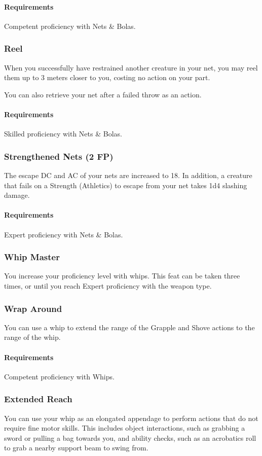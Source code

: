    \paragraph{Requirements} Competent proficiency with Nets \& Bolas.
\subsubsection{Reel} \label{feat::reel}
    When you successfully have restrained another creature in your net, you may reel them up to 3 meters closer to you, costing no action on your part.

    You can also retrieve your net after a failed throw as an action.
    \paragraph{Requirements} Skilled proficiency with Nets \& Bolas.
\subsubsection{Strengthened Nets (2 FP)} \label{feat::strengthenednets}
    The escape DC and AC of your nets are increased to 18.
    In addition, a creature that fails on a Strength (Athletics) to escape from your net takes 1d4 slashing damage.
    \paragraph{Requirements} Expert proficiency with Nets \& Bolas.
\subsubsection{Whip Master} \label{feat::whipmaster}
    You increase your proficiency level with whips.
    This feat can be taken three times, or until you reach Expert proficiency with the weapon type.
\subsubsection{Wrap Around} \label{feat::wraparound}
    You can use a whip to extend the range of the Grapple and Shove actions to the range of the whip.
    \paragraph{Requirements} Competent proficiency with Whips.
\subsubsection{Extended Reach} \label{feat::extendedreach}
    You can use your whip as an elongated appendage to perform actions that do not require fine motor skills.
    This includes object interactions, such as grabbing a sword or pulling a bag towards you, and ability checks, such as an acrobatics roll to grab a nearby support beam to swing from.
